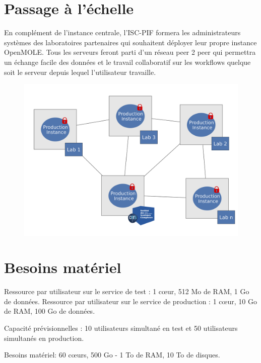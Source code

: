 \documentclass[10pt,a4paper]{article}
\begin{document}
\section{Passage à l'échelle}

En complément de l'instance centrale, l'ISC-PIF formera les administrateurs systèmes des laboratoires partenaires qui souhaitent déployer leur propre instance OpenMOLE. Tous les serveurs feront parti d'un réseau peer 2 peer qui permettra un échange facile des données et le travail collaboratif sur les workflows quelque soit le serveur depuis lequel l'utilisateur travaille.

\begin{figure}[h]
 \centering
  \includegraphics[width=0.8\linewidth]{img/instances-p2p.png}
\end{figure}


\section{Besoins matériel}

Ressource par utilisateur sur le service de test : 1 cœur, 512 Mo de RAM, 1 Go de données.
Ressource par utilisateur sur le service de production : 1 cœur, 10 Go de RAM, 100 Go de données.

Capacité prévisionnelles : 10 utilisateurs simultané en test et 50 utilisateurs simultanés en production.

Besoins matériel: 60 cœurs, 500 Go - 1 To de RAM, 10 To de disques.
\end{document}
